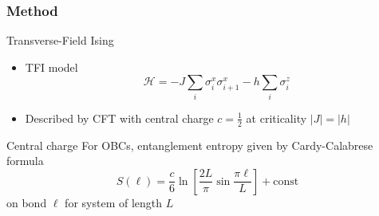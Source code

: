 \documentclass[10pt]{beamer}
\begin{document}
\begin{frame}
    \frametitle{Method}

    \begin{block}{Transverse-Field Ising}
        \begin{itemize}
            \item TFI model $$\mathcal{H} = -J\sum_i \sigma^x_i \sigma^x_{i+1} - h\sum_i \sigma^z_i$$
            \pause
            \item Described by CFT with central charge $c= \frac{1}{2}$ at criticality $|J| = |h|$
        \end{itemize}
    \end{block}

    \pause
    \begin{block}{Central charge}
        For OBCs, entanglement entropy given by Cardy-Calabrese formula $$S(\ell) = \frac{c}{6} \ln\left[\frac{2L}{\pi} \sin \frac{\pi \ell}{L} \right] + \text{const}$$ on bond $\ell$ for system of length $L$
    \end{block}
\end{frame}
\end{document}
